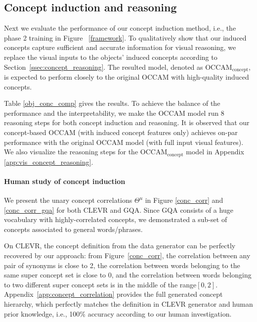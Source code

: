 \documentclass[10pt,twocolumn,letterpaper]{article}
\begin{document}
%
 \subsection{Concept induction and reasoning}
Next we evaluate the performance of our concept induction method, i.e., the phase 2 training in Figure ~\ref{framework}.
To qualitatively show that our induced concepts capture sufficient and accurate information for visual reasoning, we replace the visual inputs to the objects' induced concepts according to Section~\ref{ssec:concept_reasoning}. The resulted model, denoted as OCCAM$_{\textrm{concept}}$, is expected to perform closely to the original OCCAM with high-quality induced concepts.

Table \ref{obj_conc_comp} gives the results.
To achieve the balance of the performance and the interpretability, we make the OCCAM model run 8 reasoning steps for both concept induction and reasoning. It is observed that our concept-based OCCAM (with induced concept features only) achieves on-par performance with the original OCCAM model (with full input visual features).
We also visualize the reasoning steps for the OCCAM$_{\textrm{concept}}$ model in Appendix \ref{app:vis_concept_reasoning}.



\vspace{-3mm}
\paragraph{Human study of concept induction}
We present the unary concept correlations $\Theta^u$ in Figure \ref{conc_corr} and \ref{conc_corr_gqa} for both CLEVR and GQA. Since GQA consists of a huge vocabulary with highly-correlated concepts, we demonstrated a sub-set of concepts associated to general words/phrases.

On CLEVR, the concept definition from the data generator can be perfectly recovered by our approach: from Figure~\ref{conc_corr},
the correlation between any pair of synonyms is close to 2, the correlation between words belonging to the same super concept set is close to 0, and the correlation between words belonging to two different super concept sets is in the middle of the range$[0,2]$. 
Appendix~\ref{app:concept_correlation} provides the full generated concept hierarchy, which perfectly matches the definition in CLEVR generator and human prior knowledge, i.e., 100\% accuracy according to our human investigation.
\end{document}
